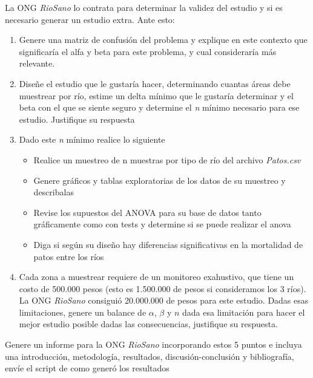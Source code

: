 \documentclass[]{article}
\providecommand{\tightlist}{%
  \setlength{\itemsep}{0pt}\setlength{\parskip}{0pt}}
\begin{document}
La ONG \emph{RioSano} lo contrata para determinar la validez del estudio
y si es necesario generar un estudio extra. Ante esto:

\begin{enumerate}
\def\labelenumi{\arabic{enumi}.}
\item
  Genere una matriz de confusión del problema y explique en este
  contexto que significaría el alfa y beta para este problema, y cual
  consideraría más relevante.
\item
  Diseñe el estudio que le gustaría hacer, determinando cuantas áreas
  debe muestrear por río, estime un delta mínimo que le gustaría
  determinar y el beta con el que se siente seguro y determine el
  \emph{n} mínimo necesario para ese estudio. Justifique su respuesta
\item
  Dado este \emph{n} mínimo realice lo siguiente

  \begin{itemize}
  \tightlist
  \item
    Realice un muestreo de n muestras por tipo de río del archivo
    \emph{Patos.csv}
  \item
    Genere gráficos y tablas exploratorias de los datos de su muestreo y
    describalas
  \item
    Revise los supuestos del ANOVA para su base de datos tanto
    gráficamente como con tests y determine si se puede realizar el
    anova
  \item
    Diga si según su diseño hay diferencias significativas en la
    mortalidad de patos entre los ríos
  \end{itemize}
\item
  Cada zona a muestrear requiere de un monitoreo exahustivo, que tiene
  un costo de 500.000 pesos (esto es 1.500.000 de pesos si consideramos
  los 3 ríos). La ONG \emph{RioSano} consiguió 20.000.000 de pesos para
  este estudio. Dadas esas limitaciones, genere un balance de
  \(\alpha\), \(\beta\) y \(n\) dada esa limitación para hacer el mejor
  estudio posible dadas las consecuencias, justifique su respuesta.
\end{enumerate}

Genere un informe para la ONG \emph{RioSano} incorporando estos 5 puntos
e incluya una introducción, metodología, resultados,
discusión-conclusión y bibliografía, envíe el script de como generó los
resultados
\end{document}
